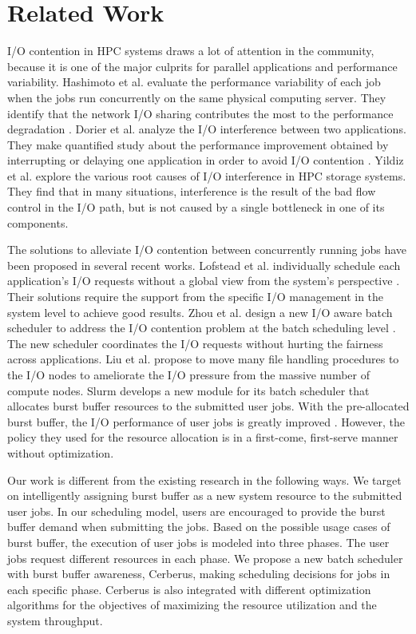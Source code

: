 \section{Related Work}
\label{Sec:RelatedWorks}

I/O contention in HPC systems draws a lot of attention in the community,
because it is one of the major culprits for parallel applications and performance variability.
Hashimoto et al. evaluate the performance variability of each job
when the jobs run concurrently on the same physical computing server.
They identify that the network I/O sharing contributes the most to
the performance degradation \cite{hashimoto:ICNC:2012}.
Dorier et al. analyze the I/O interference between two applications.
They make quantified study about the performance improvement obtained
by interrupting or delaying one application in order to avoid I/O contention \cite{dorier:IPDPS:2014}.
Yildiz et al. \cite{yildiz:IPDPS:2016} explore the various root causes
of I/O interference in HPC storage systems.
They find that in many situations, interference is the result of the bad flow control in the I/O path,
but is not caused by a single bottleneck in one of its components.

The solutions to alleviate I/O contention between concurrently
running jobs have been proposed in several recent works.
Lofstead et al. individually schedule each application's I/O requests without
a global view from the system's perspective \cite{lofstead:sc:2010}.
Their solutions require the support from the specific I/O management
in the system level to achieve good results.
Zhou et al. design a new I/O aware batch scheduler to address the I/O
contention problem at the batch scheduling level \cite{zhou:Cluster:2015}.
The new scheduler coordinates the  I/O requests without hurting the fairness across applications.
Liu et al. propose to move many file handling procedures to the I/O nodes to
ameliorate the I/O pressure from the massive number of compute nodes\cite{Liu:MSST:2012}.
Slurm develops a new module for its batch scheduler that allocates burst buffer
resources to the submitted user jobs. With the pre-allocated burst buffer,
the I/O performance of user jobs is greatly improved \cite{SlurmBBGuide}.
However, the policy they used for the resource allocation is in a first-come, first-serve manner without optimization.

Our work is different from the existing research in the following ways.
We target on intelligently assigning burst buffer as a new system resource to the submitted user jobs.
In our scheduling model, users are encouraged to provide the burst buffer demand when submitting the jobs.
Based on the possible usage cases of burst buffer, the execution of user jobs is modeled into three phases.
The user jobs request different resources in each phase.
We propose a new batch scheduler with burst buffer awareness, Cerberus,
making scheduling decisions for jobs in each specific phase.
Cerberus is also integrated with different optimization algorithms for the objectives of maximizing the resource utilization and the system throughput.




